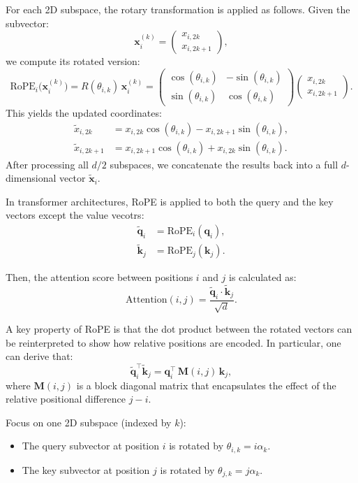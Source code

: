 For each 2D subspace, the rotary transformation is applied as follows. Given the subvector:
\[
\mathbf{x}_i^{(k)} = 
\begin{pmatrix}
x_{i,2k} \\
x_{i,2k+1}
\end{pmatrix},
\]
we compute its rotated version:
\[
\text{RoPE}_i \bigl(\mathbf{x}_i^{(k)}\bigr)
= R(\theta_{i, k})\, \mathbf{x}_i^{(k)}
= \begin{pmatrix}
\cos(\theta_{i, k}) & -\sin(\theta_{i, k}) \\
\sin(\theta_{i, k}) & \cos(\theta_{i, k})
\end{pmatrix}
\begin{pmatrix}
x_{i,2k} \\
x_{i,2k+1}
\end{pmatrix}.
\]
This yields the updated coordinates:
\[
\begin{aligned}
\tilde{x}_{i, 2k} &= x_{i,2k}\cos(\theta_{i,k}) - x_{i,2k+1}\sin(\theta_{i,k}),\\[6pt]
\tilde{x}_{i, 2k+1} &= x_{i,2k+1}\cos(\theta_{i,k}) + x_{i,2k}\sin(\theta_{i,k}).
\end{aligned}
\]
After processing all \(d/2\) subspaces, we concatenate the results back into a full \(d\)-dimensional vector \(\tilde{\mathbf{x}}_i\).

In transformer architectures, RoPE is applied to both the query and the key vectors except the value vecotrs:
\[
\begin{aligned}
\tilde{\mathbf{q}}_i &= \text{RoPE}_i(\mathbf{q}_i), \\
\tilde{\mathbf{k}}_j &= \text{RoPE}_j(\mathbf{k}_j).
\end{aligned}
\]

Then, the attention score between positions \(i\) and \(j\) is calculated as:
\[
\text{Attention}(i, j) = \frac{\tilde{\mathbf{q}}_i \cdot \tilde{\mathbf{k}}_j}{\sqrt{d}}.
\]

A key property of RoPE is that the dot product between the rotated vectors can be reinterpreted to show how relative positions are encoded. In particular, one can derive that:
\[
\tilde{\mathbf{q}}_i^\top \tilde{\mathbf{k}}_j = \mathbf{q}_i^\top\, \mathbf{M}(i,j)\, \mathbf{k}_j,
\]
where \(\mathbf{M}(i,j)\) is a block diagonal matrix that encapsulates the effect of the relative positional difference \(j-i\).

Focus on one 2D subspace (indexed by \(k\)):
\begin{itemize}
	\item The query subvector at position \(i\) is rotated by \(\theta_{i,k} = i\alpha_k\).
	\item The key subvector at position \(j\) is rotated by \(\theta_{j,k} = j\alpha_k\).
\end{itemize}

